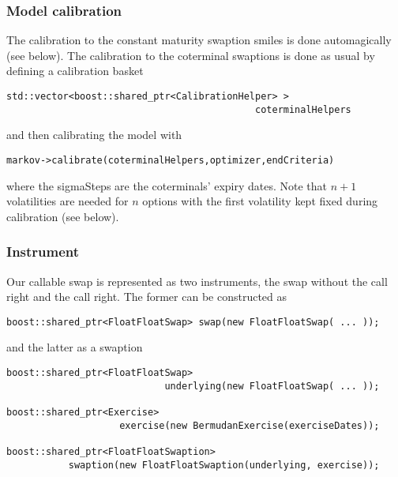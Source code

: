 \message{ !name(mfpresql.tex)}\documentclass{beamer}
\begin{document}
\begin{frame}[fragile]
\frametitle{Model calibration}
The calibration to the constant maturity swaption smiles is done automagically (see below). The calibration to
the coterminal swaptions is done as usual by defining a calibration basket

\begin{verbatim}
std::vector<boost::shared_ptr<CalibrationHelper> > 
                                            coterminalHelpers
\end{verbatim}

and then calibrating the model with

\begin{verbatim}
markov->calibrate(coterminalHelpers,optimizer,endCriteria)
\end{verbatim}

where the sigmaSteps are the coterminals' expiry dates. Note that $n+1$ volatilities are needed for $n$
options with the first volatility kept fixed during calibration (see below).
\end{frame}


\begin{frame}[fragile]
\frametitle{Instrument}
Our callable swap is represented as two instruments, the swap without the call right and the call right.
The former can be constructed as

\begin{verbatim}
boost::shared_ptr<FloatFloatSwap> swap(new FloatFloatSwap( ... ));
\end{verbatim}

and the latter as a swaption

\begin{verbatim}
boost::shared_ptr<FloatFloatSwap> 
                            underlying(new FloatFloatSwap( ... ));

boost::shared_ptr<Exercise> 
                    exercise(new BermudanExercise(exerciseDates));

boost::shared_ptr<FloatFloatSwaption> 
           swaption(new FloatFloatSwaption(underlying, exercise));
\end{verbatim}

\end{frame}
\end{document}
